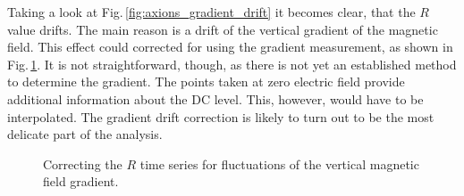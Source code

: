 Taking a look at Fig.\,\ref{fig:axions_gradient_drift} it becomes clear, that the $R$ value drifts. The main reason is a drift of the vertical gradient of the magnetic field. This effect could corrected for using the gradient measurement, as shown in Fig.\,\ref{fig:axions_gradient_drift_correction}. It is not straightforward, though, as there is not yet an established method to determine the gradient. The points taken at zero electric field provide additional information about the DC level. This, however, would have to be interpolated. The gradient drift correction is likely to turn out to be the most delicate part of the analysis.

\begin{figure}[bth]
  \myfloatalign
  \quad
  \caption{Correcting the $R$ time series for fluctuations of the vertical magnetic field gradient.}
  \label{fig:axions_gradient_drift_correction}
\end{figure}

